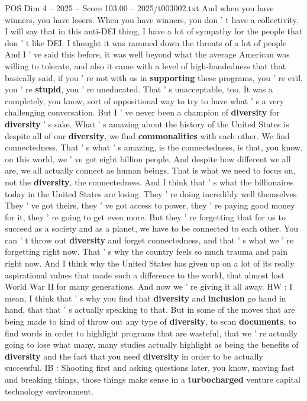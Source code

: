\begin{textsample}{POS Dim 4 – 2025 – Score 103.00 – 2025/t003002.txt}
And when you have winners, you have losers.
When you have winners, you don ' t have a collectivity.
I will say that in this anti-DEI thing, I have a lot of sympathy for the people that don ' t like DEI.
I thought it was rammed down the throats of a lot of people And I ' ve said this before, it was well beyond what the average American was willing to tolerate, and also it came with a level of high-handedness that that basically said, if you ' re not with us in \textbf{supporting} these programs, you ' re evil, you ' re \textbf{stupid}, you ' re uneducated.
That ' s unacceptable, too.
It was a completely, you know, sort of oppositional way to try to have what ' s a very challenging conversation.
But I ' ve never been a champion of \textbf{diversity} for \textbf{diversity} ' s sake.
What ' s amazing about the history of the United States is despite all of our \textbf{diversity}, we find \textbf{commonalities} with each other.
We find connectedness.
That ' s what ' s amazing, is the connectedness, is that, you know, on this world, we ' ve got eight billion people.
And despite how different we all are, we all actually connect as human beings.
That is what we need to focus on, not the \textbf{diversity}, the connectedness.
And I think that ' s what the billionaires today in the United States are losing.
They ' re doing incredibly well themselves.
They ' ve got theirs, they ' ve got access to power, they ' re paying good money for it, they ' re going to get even more.
But they ' re forgetting that for us to succeed as a society and as a planet, we have to be connected to each other.
You can ' t throw out \textbf{diversity} and forget connectedness, and that ' s what we ' re forgetting right now.
That ' s why the country feels so much trauma and pain right now.
And I think why the United States has given up on a lot of its really aspirational values that made such a difference to the world, that almost lost World War II for many generations.
And now we ' re giving it all away.
HW : I mean, I think that ' s why you find that \textbf{diversity} and \textbf{inclusion} go hand in hand, that that ' s actually speaking to that.
But in some of the moves that are being made to kind of throw out any type of \textbf{diversity}, to scan \textbf{documents}, to find words in order to highlight programs that are wasteful, that we ' re actually going to lose what many, many studies actually highlight as being the benefits of \textbf{diversity} and the fact that you need \textbf{diversity} in order to be actually successful.
IB : Shooting first and asking questions later, you know, moving fast and breaking things, those things make sense in a \textbf{turbocharged} venture capital technology environment.

\end{textsample}

